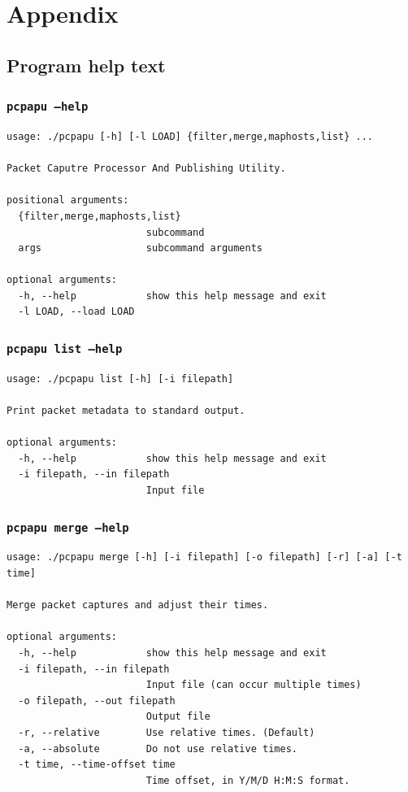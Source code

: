 \documentclass[10pt,a4paper,notitlepage]{report}
\begin{document}
\chapter{Appendix}
\section{Program help text}
\label{sec:helptext}
\subsection{\texttt{pcpapu --help}}
\begin{verbatim}
usage: ./pcpapu [-h] [-l LOAD] {filter,merge,maphosts,list} ...

Packet Caputre Processor And Publishing Utility.

positional arguments:
  {filter,merge,maphosts,list}
                        subcommand
  args                  subcommand arguments

optional arguments:
  -h, --help            show this help message and exit
  -l LOAD, --load LOAD
\end{verbatim}

\subsection{\texttt{pcpapu list --help}}
\begin{verbatim}
usage: ./pcpapu list [-h] [-i filepath]

Print packet metadata to standard output.

optional arguments:
  -h, --help            show this help message and exit
  -i filepath, --in filepath
                        Input file
\end{verbatim}

\subsection{\texttt{pcpapu merge --help}}
\begin{verbatim}
usage: ./pcpapu merge [-h] [-i filepath] [-o filepath] [-r] [-a] [-t time]

Merge packet captures and adjust their times.

optional arguments:
  -h, --help            show this help message and exit
  -i filepath, --in filepath
                        Input file (can occur multiple times)
  -o filepath, --out filepath
                        Output file
  -r, --relative        Use relative times. (Default)
  -a, --absolute        Do not use relative times.
  -t time, --time-offset time
                        Time offset, in Y/M/D H:M:S format.
\end{verbatim}
\end{document}
